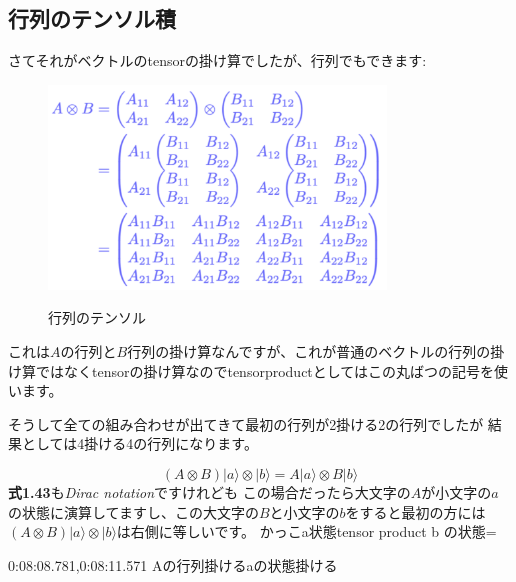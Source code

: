 \subsection{行列のテンソル積}
さてそれがベクトルのtensorの掛け算でしたが、行列でもできます:
\begin{figure}[H]
    \centering
    \includegraphics[width=0.8\textwidth]{lesson2/matrix_tensor.pdf}
    \label{fig: 1}
    \begin{center}
        \caption{行列のテンソル}
    \end{center}
\end{figure}
これは$A$の行列と$B$行列の掛け算なんですが、これが普通のベクトルの行列の掛け算ではなくtensorの掛け算なのでtensorproductとしてはこの丸ばつの記号を使います。

そうして全ての組み合わせが出てきて最初の行列が2掛ける2の行列でしたが
結果としては4掛ける4の行列になります。


\begin{equation}
(A \otimes B)|a\rangle \otimes|b\rangle=A|a\rangle \otimes B|b\rangle
\end{equation}
\textbf{式1.43}も\emph{Dirac notation}ですけれども
この場合だったら大文字の$A$が小文字の$a$の状態に演算してますし、この大文字の$B$と小文字の$b$をすると最初の方には$(A \otimes B)|a\rangle \otimes|b\rangle$は右側に等しいです。
\iffalse
かっこa状態tensor product b の状態=

0:08:08.781,0:08:11.571
Aの行列掛けるaの状態掛ける

